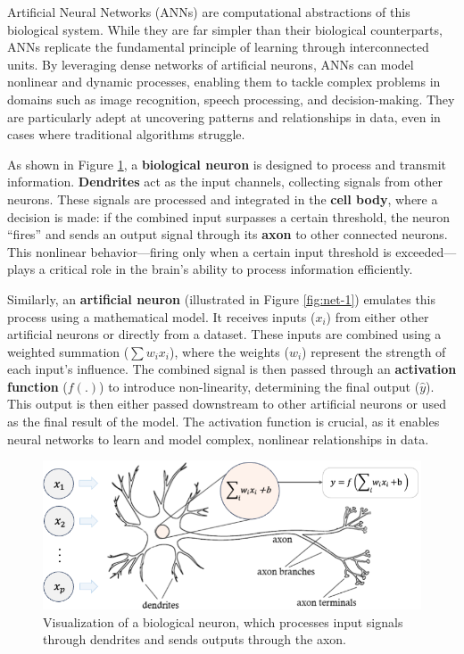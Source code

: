 \documentclass[
]{book}
\theoremstyle{definition}
\theoremstyle{definition}
\theoremstyle{definition}
\theoremstyle{definition}
\theoremstyle{remark}
\begin{document}
Artificial Neural Networks (ANNs) are computational abstractions of this biological system. While they are far simpler than their biological counterparts, ANNs replicate the fundamental principle of learning through interconnected units. By leveraging dense networks of artificial neurons, ANNs can model nonlinear and dynamic processes, enabling them to tackle complex problems in domains such as image recognition, speech processing, and decision-making. They are particularly adept at uncovering patterns and relationships in data, even in cases where traditional algorithms struggle.

As shown in Figure \ref{fig:net-brain}, a \textbf{biological neuron} is designed to process and transmit information. \textbf{Dendrites} act as the input channels, collecting signals from other neurons. These signals are processed and integrated in the \textbf{cell body}, where a decision is made: if the combined input surpasses a certain threshold, the neuron ``fires'' and sends an output signal through its \textbf{axon} to other connected neurons. This nonlinear behavior---firing only when a certain input threshold is exceeded---plays a critical role in the brain's ability to process information efficiently.

Similarly, an \textbf{artificial neuron} (illustrated in Figure \ref{fig:net-1}) emulates this process using a mathematical model. It receives inputs (\(x_i\)) from either other artificial neurons or directly from a dataset. These inputs are combined using a weighted summation (\(\sum w_i x_i\)), where the weights (\(w_i\)) represent the strength of each input's influence. The combined signal is then passed through an \textbf{activation function} (\(f(.)\)) to introduce non-linearity, determining the final output (\(\hat{y}\)). This output is then either passed downstream to other artificial neurons or used as the final result of the model. The activation function is crucial, as it enables neural networks to learn and model complex, nonlinear relationships in data.

\begin{figure}

{\centering \includegraphics[width=0.75\linewidth]{images/net_brain} 

}

\caption{Visualization of a biological neuron, which processes input signals through dendrites and sends outputs through the axon.}\label{fig:net-brain}
\end{figure}
\end{document}
